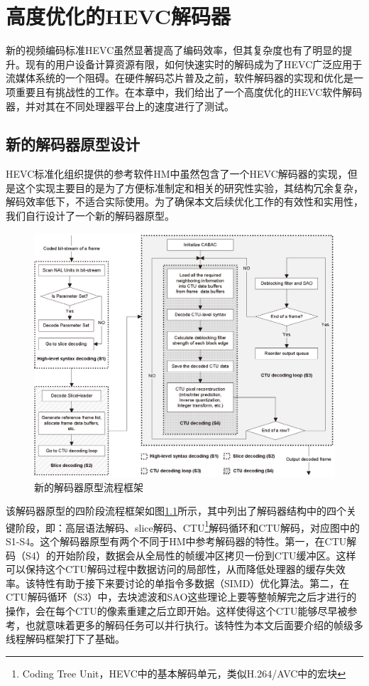 \chapter{高度优化的HEVC解码器}

新的视频编码标准HEVC虽然显著提高了编码效率，但其复杂度也有了明显的提升。现有的用户设备计算资源有限，如何快速实时的解码成为了HEVC广泛应用于流媒体系统的一个阻碍。在硬件解码芯片普及之前，软件解码器的实现和优化是一项重要且有挑战性的工作。在本章中，我们给出了一个高度优化的HEVC软件解码器，并对其在不同处理器平台上的速度进行了测试。

\section{新的解码器原型设计}

HEVC标准化组织提供的参考软件HM中虽然包含了一个HEVC解码器的实现，但是这个实现主要目的是为了方便标准制定和相关的研究性实验，其结构冗余复杂，解码效率低下，不适合实际使用。为了确保本文后续优化工作的有效性和实用性，我们自行设计了一个新的解码器原型。

\begin{figure}[t]
	\centering
	\includegraphics[width = 1.0\linewidth]{eps/decoding_workflow}
	\caption{\label{fig:decoding_workflow}新的解码器原型流程框架}
\end{figure}

该解码器原型的四阶段流程框架如图\ref{fig:decoding_workflow}所示，其中列出了解码器结构中的四个关键阶段，即：高层语法解码、slice解码、CTU\footnote{Coding Tree Unit，HEVC中的基本解码单元，类似H.264/AVC中的宏块}解码循环和CTU解码，对应图中的S1-S4。这个解码器原型有两个不同于HM中参考解码器的特性。第一，在CTU解码（S4）的开始阶段，数据会从全局性的帧缓冲区拷贝一份到CTU缓冲区。这样可以保持这个CTU解码过程中数据访问的局部性，从而降低处理器的缓存失效率。该特性有助于接下来要讨论的单指令多数据（SIMD）优化算法。第二，在CTU解码循环（S3）中，去块滤波和SAO这些理论上要等整帧解完之后才进行的操作，会在每个CTU的像素重建之后立即开始。这样使得这个CTU能够尽早被参考，也就意味着更多的解码任务可以并行执行。该特性为本文后面要介绍的帧级多线程解码框架打下了基础。

